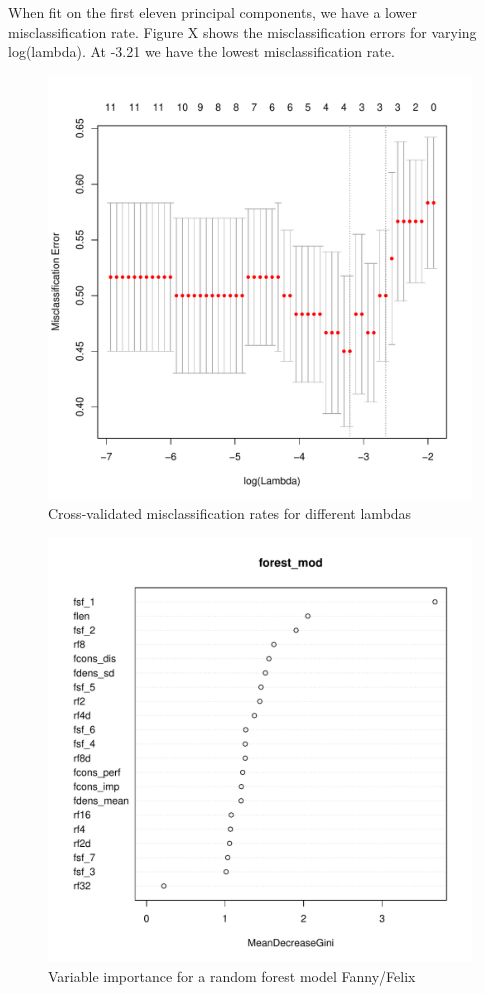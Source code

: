 \documentclass[12pt,twoside]{reedthesis}
\theoremstyle{definition}
\theoremstyle{definition}
\theoremstyle{definition}
\theoremstyle{remark}
\begin{document}
When fit on the first eleven principal components, we have a lower
misclassification rate. Figure X shows the misclassification errors for
varying log(lambda). At -3.21 we have the lowest misclassification rate.
\begin{figure}[h]
\centering
\includegraphics[scale = .5]{images/pca_loglambda_f.pdf}
\caption{Cross-validated misclassification rates for different lambdas}
\label{subd}
\end{figure}
\begin{figure}[h]
\centering
\includegraphics[scale = .5]{images/varImp_f.pdf}
\caption{Variable importance for a random forest model Fanny/Felix}
\label{subd}
\end{figure}
\end{document}
